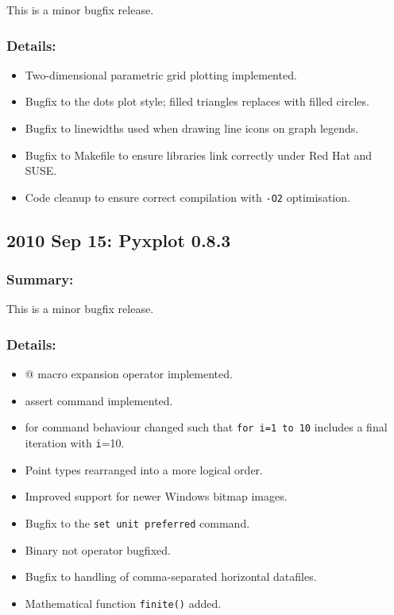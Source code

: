 This is a minor bugfix release.

\subsubsection*{Details:}

\begin{itemize}
\item Two-dimensional parametric grid plotting implemented.
\item Bugfix to the dots plot style; filled triangles replaces with filled circles.
\item Bugfix to linewidths used when drawing line icons on graph legends.
\item Bugfix to Makefile to ensure libraries link correctly under Red Hat and SUSE.
\item Code cleanup to ensure correct compilation with {\tt -O2} optimisation.
\end{itemize}

\subsection*{2010 Sep 15: Pyxplot 0.8.3}

\subsubsection*{Summary:}

This is a minor bugfix release.

\subsubsection*{Details:}

\begin{itemize}
\item @ macro expansion operator implemented.
\item assert command implemented.
\item for command behaviour changed such that {\tt for i=1 to 10} includes a final iteration with {\tt i}=10.
\item Point types rearranged into a more logical order.
\item Improved support for newer Windows bitmap images.
\item Bugfix to the {\tt set unit preferred} command.
\item Binary not operator bugfixed.
\item Bugfix to handling of comma-separated horizontal datafiles.
\item Mathematical function {\tt finite()} added.
\end{itemize}

